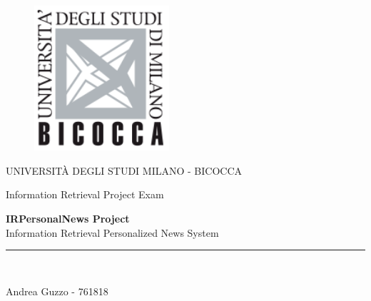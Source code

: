 \documentclass[11pt, english]{article}
\begin{document}
\begin{titlepage}

\begin{center}
\vspace*{-1in}
\begin{figure}[htb]
\begin{center}
\includegraphics[width=5cm]{Resources/BicoccaLogo.png}
\end{center}
\end{figure}
UNIVERSITÀ DEGLI STUDI MILANO - BICOCCA \\
\vspace*{0.4in}
\begin{large}
Information Retrieval Project Exam\\
\end{large}
\vspace*{0.2in}
\begin{Large}
\textbf{IRPersonalNews Project} \\
\vspace*{0.15in}
Information Retrieval Personalized News System \\
\end{Large}
\vspace*{0.3in}

\vspace*{0.3in}
\rule{80mm}{0.1mm}\\
\vspace*{0.1in}
\begin{large}
Andrea Guzzo - 761818
\end{large}
\end{center}
\end{titlepage}

\newcommand{\CC}{C\nolinebreak\hspace{-.05em}\raisebox{.4ex}{\tiny\bf +}\nolinebreak\hspace{-.10em}\raisebox{.4ex}{\tiny\bf +}}
\def\CC{{C\nolinebreak[4]\hspace{-.05em}\raisebox{.4ex}{\tiny\bf ++}}}
\end{document}
